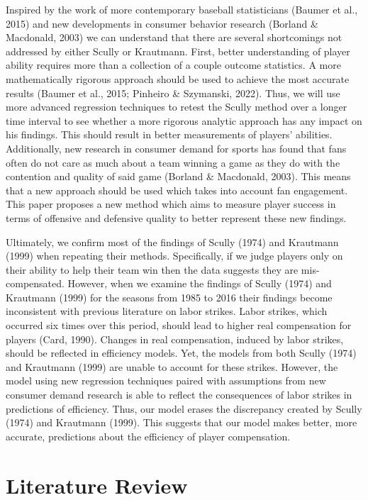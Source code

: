 \documentclass[
  12pt,
  letterpaper,
  DIV=11,
  numbers=noendperiod]{scrartcl}
\begin{document}
Inspired by the work of more contemporary baseball statisticians (Baumer
et al., 2015) and new developments in consumer behavior research
(Borland \& Macdonald, 2003) we can understand that there are several
shortcomings not addressed by either Scully or Krautmann. First, better
understanding of player ability requires more than a collection of a
couple outcome statistics. A more mathematically rigorous approach
should be used to achieve the most accurate results (Baumer et al.,
2015; Pinheiro \& Szymanski, 2022). Thus, we will use more advanced
regression techniques to retest the Scully method over a longer time
interval to see whether a more rigorous analytic approach has any impact
on his findings. This should result in better measurements of players'
abilities. Additionally, new research in consumer demand for sports has
found that fans often do not care as much about a team winning a game as
they do with the contention and quality of said game (Borland \&
Macdonald, 2003). This means that a new approach should be used which
takes into account fan engagement. This paper proposes a new method
which aims to measure player success in terms of offensive and defensive
quality to better represent these new findings.

Ultimately, we confirm most of the findings of Scully (1974) and
Krautmann (1999) when repeating their methods. Specifically, if we judge
players only on their ability to help their team win then the data
suggests they are mis-compensated. However, when we examine the findings
of Scully (1974) and Krautmann (1999) for the seasons from 1985 to 2016
their findings become inconsistent with previous literature on labor
strikes. Labor strikes, which occurred six times over this period,
should lead to higher real compensation for players (Card, 1990).
Changes in real compensation, induced by labor strikes, should be
reflected in efficiency models. Yet, the models from both Scully (1974)
and Krautmann (1999) are unable to account for these strikes. However,
the model using new regression techniques paired with assumptions from
new consumer demand research is able to reflect the consequences of
labor strikes in predictions of efficiency. Thus, our model erases the
discrepancy created by Scully (1974) and Krautmann (1999). This suggests
that our model makes better, more accurate, predictions about the
efficiency of player compensation.

\hypertarget{sec-LitReview}{%
\section{Literature Review}\label{sec-LitReview}}
\end{document}

